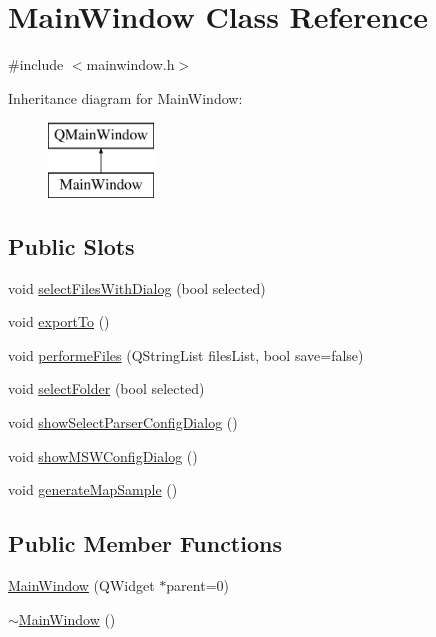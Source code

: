 \hypertarget{class_main_window}{}\section{Main\+Window Class Reference}
\label{class_main_window}


{\ttfamily \#include $<$mainwindow.\+h$>$}

Inheritance diagram for Main\+Window\+:\begin{figure}[H]
\begin{center}
\leavevmode
\includegraphics[height=2.000000cm]{class_main_window}
\end{center}
\end{figure}
\subsection*{Public Slots}
\begin{DoxyCompactItemize}
\item 
void \hyperlink{class_main_window_ae454fa786ec097491d801d8bc7d3824c}{select\+Files\+With\+Dialog} (bool selected)
\item 
void \hyperlink{class_main_window_abcf1ecfd08a6967a28853153281ce4d8}{export\+To} ()
\item 
void \hyperlink{class_main_window_a48108540b64f60b2785c397cee553fbf}{performe\+Files} (Q\+String\+List files\+List, bool save=false)
\item 
void \hyperlink{class_main_window_ac7e1b1634d7b3e15641ca73422a4648d}{select\+Folder} (bool selected)
\item 
void \hyperlink{class_main_window_ab8d462abbdc0627822672281f8e07d50}{show\+Select\+Parser\+Config\+Dialog} ()
\item 
void \hyperlink{class_main_window_ab7a1a0cb0ab474a3fc80d17bf37c6b47}{show\+M\+S\+W\+Config\+Dialog} ()
\item 
void \hyperlink{class_main_window_addb903e5eac4179672e9825847af9be0}{generate\+Map\+Sample} ()
\end{DoxyCompactItemize}
\subsection*{Public Member Functions}
\begin{DoxyCompactItemize}
\item 
\hyperlink{class_main_window_a8b244be8b7b7db1b08de2a2acb9409db}{Main\+Window} (Q\+Widget $\ast$parent=0)
\item 
\hyperlink{class_main_window_ae98d00a93bc118200eeef9f9bba1dba7}{$\sim$\+Main\+Window} ()
\end{DoxyCompactItemize}


